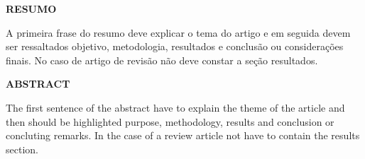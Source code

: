 \begin{center}
  \textbf{RESUMO}
\end{center}

\begin{singlespace}
  \noindent A primeira frase do resumo deve explicar o tema do artigo e em
  seguida devem ser ressaltados objetivo, metodologia, resultados e conclusão ou
  considerações finais. No caso de artigo de revisão não deve constar a seção
  resultados.
\end{singlespace}

\begin{center}
  \textbf{ABSTRACT}
\end{center}

\begin{singlespace}
  \noindent The first sentence of the abstract have to explain the theme of the
  article and then should be highlighted purpose, methodology, results and
  conclusion or concluting remarks. In the case of a review article not have to
  contain the results section.
\end{singlespace}
